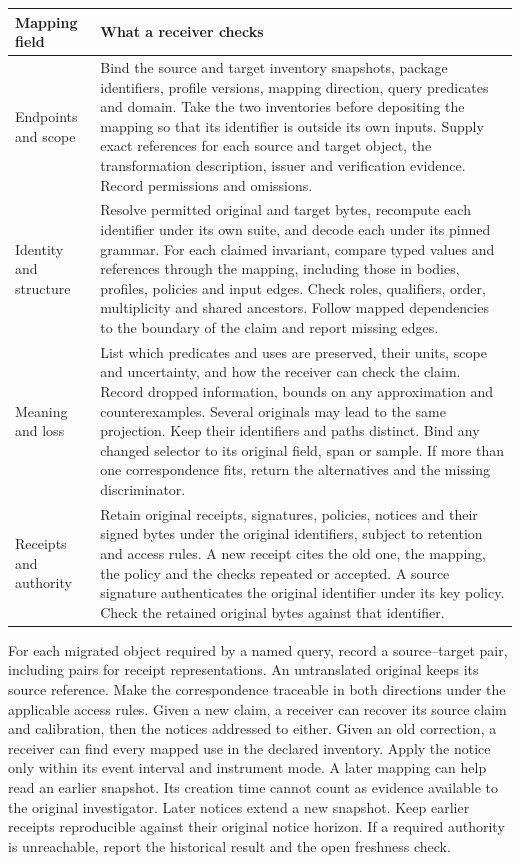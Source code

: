 \documentclass[11pt,a4paper]{article}
\begin{document}
\small
\begin{tabularx}{\linewidth}{@{}L{.205\linewidth}Y@{}}
\toprule
\textbf{Mapping field} & \textbf{What a receiver checks} \\ \midrule
Endpoints and scope & Bind the source and target inventory snapshots, package identifiers, profile versions, mapping direction, query predicates and domain. Take the two inventories before depositing the mapping so that its identifier is outside its own inputs. Supply exact references for each source and target object, the transformation description, issuer and verification evidence. Record permissions and omissions. \\
Identity and structure & Resolve permitted original and target bytes, recompute each identifier under its own suite, and decode each under its pinned grammar. For each claimed invariant, compare typed values and references through the mapping, including those in bodies, profiles, policies and input edges. Check roles, qualifiers, order, multiplicity and shared ancestors. Follow mapped dependencies to the boundary of the claim and report missing edges. \\
Meaning and loss & List which predicates and uses are preserved, their units, scope and uncertainty, and how the receiver can check the claim. Record dropped information, bounds on any approximation and counterexamples. Several originals may lead to the same projection. Keep their identifiers and paths distinct. Bind any changed selector to its original field, span or sample. If more than one correspondence fits, return the alternatives and the missing discriminator. \\
Receipts and authority & Retain original receipts, signatures, policies, notices and their signed bytes under the original identifiers, subject to retention and access rules. A new receipt cites the old one, the mapping, the policy and the checks repeated or accepted. A source signature authenticates the original identifier under its key policy. Check the retained original bytes against that identifier. \\
\bottomrule
\end{tabularx}
\normalsize

For each migrated object required by a named query, record a source--target pair, including pairs for receipt representations. An untranslated original keeps its source reference. Make the correspondence traceable in both directions under the applicable access rules. Given a new claim, a receiver can recover its source claim and calibration, then the notices addressed to either. Given an old correction, a receiver can find every mapped use in the declared inventory. Apply the notice only within its event interval and instrument mode. A later mapping can help read an earlier snapshot. Its creation time cannot count as evidence available to the original investigator. Later notices extend a new snapshot. Keep earlier receipts reproducible against their original notice horizon. If a required authority is unreachable, report the historical result and the open freshness check.
\end{document}
